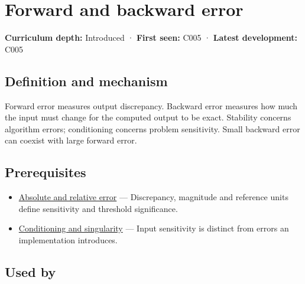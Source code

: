 \hypertarget{appendix-a7fbaf6d1b1c}{}\label{referencestart:appendix-a7fbaf6d1b1c}
\section{Forward and backward error}\label{appendix-a7fbaf6d1b1c-forward-and-backward-error}

\textbf{Curriculum depth:} Introduced · \textbf{First seen:} C005 · \textbf{Latest development:} C005

\begin{allmightroledefinition}

\subsection{Definition and mechanism}\label{appendix-a7fbaf6d1b1c-definition-and-mechanism}

Forward error measures output discrepancy. Backward error measures how much the input must change for the computed output to be exact. Stability concerns algorithm errors; conditioning concerns problem sensitivity. Small backward error can coexist with large forward error.

\end{allmightroledefinition}

\subsection{Prerequisites}\label{appendix-a7fbaf6d1b1c-prerequisites}

\begin{itemize}
\tightlist
\item
  \hyperref[appendix-3ae74e89b4e6]{Absolute and relative error} --- Discrepancy, magnitude and reference units define sensitivity and threshold significance.
\item
  \hyperref[appendix-8f6a01f284a7]{Conditioning and singularity} --- Input sensitivity is distinct from errors an implementation introduces.
\end{itemize}

\subsection{Used by}\label{appendix-a7fbaf6d1b1c-used-by}

